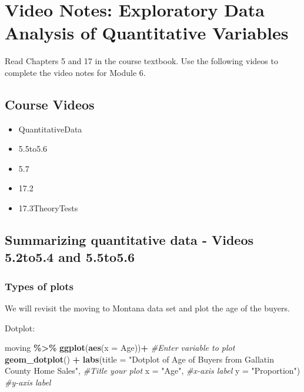 \documentclass[
]{report}
\newenvironment{Shaded}{\begin{snugshade}}{\end{snugshade}}
\newcommand{\AttributeTok}[1]{\textcolor[rgb]{0.13,0.29,0.53}{#1}}
\newcommand{\CommentTok}[1]{\textcolor[rgb]{0.56,0.35,0.01}{\textit{#1}}}
\newcommand{\FunctionTok}[1]{\textcolor[rgb]{0.13,0.29,0.53}{\textbf{#1}}}
\newcommand{\NormalTok}[1]{#1}
\newcommand{\SpecialCharTok}[1]{\textcolor[rgb]{0.81,0.36,0.00}{\textbf{#1}}}
\newcommand{\StringTok}[1]{\textcolor[rgb]{0.31,0.60,0.02}{#1}}
\begin{document}
\newpage

\section{Video Notes: Exploratory Data Analysis of Quantitative Variables}\label{video-notes-exploratory-data-analysis-of-quantitative-variables}

Read Chapters 5 and 17 in the course textbook. Use the following videos to complete the video notes for Module 6.

\subsection{Course Videos}\label{course-videos}

\begin{itemize}
\item
  QuantitativeData
\item
  5.5to5.6
\item
  5.7
\item
  17.2
\item
  17.3TheoryTests
\end{itemize}


\subsection*{Summarizing quantitative data - Videos 5.2to5.4 and 5.5to5.6}\label{summarizing-quantitative-data---videos-5.2to5.4-and-5.5to5.6}

\subsubsection*{Types of plots}\label{types-of-plots}

We will revisit the moving to Montana data set and plot the age of the buyers.

Dotplot:

\vspace{0.5in}

\begin{Shaded}
\begin{Highlighting}[]
\NormalTok{moving }\SpecialCharTok{\%\textgreater{}\%}
  \FunctionTok{ggplot}\NormalTok{(}\FunctionTok{aes}\NormalTok{(}\AttributeTok{x =}\NormalTok{ Age))}\SpecialCharTok{+} \CommentTok{\#Enter variable to plot}
  \FunctionTok{geom\_dotplot}\NormalTok{() }\SpecialCharTok{+} 
  \FunctionTok{labs}\NormalTok{(}\AttributeTok{title =} \StringTok{"Dotplot of Age of Buyers from Gallatin }
\StringTok{       County Home Sales"}\NormalTok{, }\CommentTok{\#Title your plot}
       \AttributeTok{x =} \StringTok{"Age"}\NormalTok{, }\CommentTok{\#x{-}axis label}
       \AttributeTok{y =} \StringTok{"Proportion"}\NormalTok{) }\CommentTok{\#y{-}axis label}
\end{Highlighting}
\end{Shaded}
\end{document}
